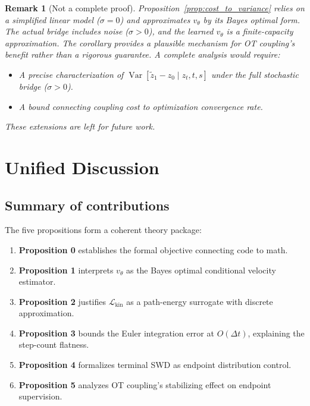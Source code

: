 \documentclass[letterpaper]{article}
\newtheorem{remark}[proposition]{Remark}
\newcommand{\Var}{\operatorname{Var}}
\newcommand{\cL}{\mathcal{L}}
\begin{document}
\begin{remark}[Not a complete proof]
Proposition~\ref{prop:cost_to_variance} relies on a simplified linear model
($\sigma=0$) and approximates $v_\theta$ by its Bayes optimal form.
The actual bridge includes noise ($\sigma > 0$), and the learned
$v_\theta$ is a finite-capacity approximation. The corollary provides
a plausible mechanism for OT coupling's benefit rather than a rigorous
guarantee. A complete analysis would require:
\begin{itemize}
    \item A precise characterization of $\Var[\tilde z_1 - z_0 \mid z_t, t, s]$
    under the full stochastic bridge ($\sigma > 0$).
    \item A bound connecting coupling cost to optimization convergence rate.
\end{itemize}
These extensions are left for future work.
\end{remark}


\section{Unified Discussion}

\subsection{Summary of contributions}

The five propositions form a coherent theory package:

\begin{enumerate}[nosep]
    \item \textbf{Proposition 0} establishes the formal objective connecting
    code to math.
    \item \textbf{Proposition 1} interprets $v_\theta$ as the Bayes optimal
    conditional velocity estimator.
    \item \textbf{Proposition 2} justifies $\cL_{\text{kin}}$ as a
    path-energy surrogate with discrete approximation.
    \item \textbf{Proposition 3} bounds the Euler integration error
    at $O(\Delta t)$, explaining the step-count flatness.
    \item \textbf{Proposition 4} formalizes terminal SWD as endpoint
    distribution control.
    \item \textbf{Proposition 5} analyzes OT coupling's stabilizing
    effect on endpoint supervision.
\end{enumerate}
\end{document}
